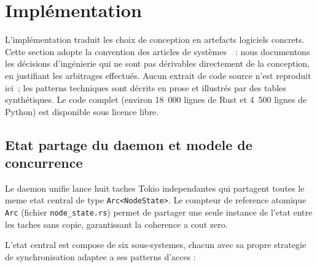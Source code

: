 \section{Implémentation}
\label{sec:implementation}

L'implémentation traduit les choix de conception en artefacts logiciels concrets. Cette section adopte la convention des articles de systèmes~\cite{verma_2015_borg,zhou_2022_carbink}~: nous documentons les décisions d'ingénierie qui ne sont pas dérivables directement de la conception, en justifiant les arbitrages effectués. Aucun extrait de code source n'est reproduit ici~; les patterns techniques sont décrits en prose et illustrés par des tables synthétiques. Le code complet (environ 18~000 lignes de Rust et 4~500 lignes de Python) est disponible sous licence libre.

\subsection{Etat partage du daemon et modele de concurrence}
\label{subsec:impl-arc-state}

Le daemon unifie lance huit taches Tokio independantes qui partagent toutes le meme etat central de type \texttt{Arc<NodeState>}. Le compteur de reference atomique \texttt{Arc} (fichier \texttt{node\_state.rs}) permet de partager une seule instance de l'etat entre les taches sans copie, garantissant la coherence a cout zero.

L'etat central est compose de six sous-systemes, chacun avec sa propre strategie de synchronisation adaptee a ses patterns d'acces :

